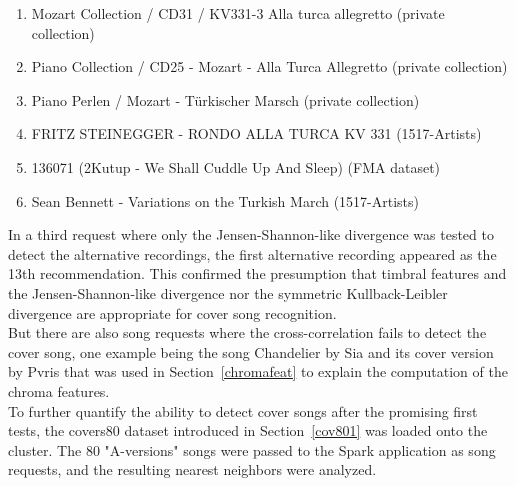 \begin{enumerate}
	\setlength\itemsep{-0.5em}
	\item Mozart Collection / CD31 / KV331-3 Alla turca allegretto (private collection)
	\item Piano Collection / CD25 - Mozart - Alla Turca Allegretto (private collection)
	\item Piano Perlen / Mozart - Türkischer Marsch (private collection)
	\item FRITZ STEINEGGER - RONDO ALLA TURCA KV 331 (1517-Artists)
	\item 136071 (2Kutup - We Shall Cuddle Up And Sleep) (FMA dataset) 
	\item Sean Bennett - Variations on the Turkish March (1517-Artists)
\end{enumerate}

\noindent %
In a third request where only the Jensen-Shannon-like divergence was tested to detect the alternative recordings, the first alternative recording appeared as the 13th recommendation. This confirmed the presumption that timbral features and the Jensen-Shannon-like divergence nor the symmetric Kullback-Leibler divergence are appropriate for cover song recognition.\\
\noindent But there are also song requests where the cross-correlation fails to detect the cover song, one example being the song Chandelier by Sia and its cover version by Pvris that was used in Section~\ref{chromafeat} to explain the computation of the chroma features.\\
\noindent To further quantify the ability to detect cover songs after the promising first tests, the covers80 dataset introduced in Section~\ref{cov801} was loaded onto the cluster. The 80 "A-versions" songs were passed to the Spark application as song requests, and the resulting nearest neighbors were analyzed.

